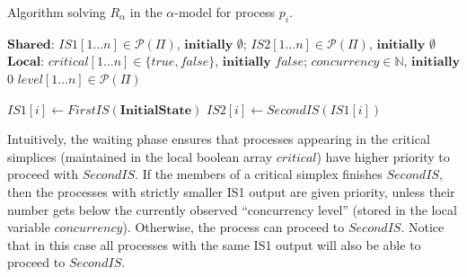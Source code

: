 \documentclass[a4paper]{article}
\begin{document}
\begin{algorithm}
\begin{small}
 \caption{Algorithm solving $R_{\alpha}$ in the $\alpha$-model for process $p_i$.\label{Alg:R_A_resolution}}
%
$\mathbf{Shared}$: $\mathit{IS1}[1\dots n] \in \mathcal{P}(\Pi)$, $\mathbf{initially}$ $\emptyset$;
$\mathit{IS2}[1\dots n] \in \mathcal{P}(\Pi)$, $\mathbf{initially}$ $\emptyset$\;
$\mathbf{Local}$: $\mathit{critical}[1\dots n] \in
\{\mathit{true},\mathit{false}\}$,
$\mathbf{initially}$ $\mathit{false}$;
$\mathit{concurrency} \in \mathbb{N}$,
$\mathbf{initially}$ $0$\;
$\mathit{level}[1\dots n]\in\mathcal{P}(\Pi)$\;
\vspace{1em}

	$\mathit{IS1}[i] \leftarrow \mathit{FirstIS}(\mathbf{InitialState})$\;
	\Do{$(\neg critical[i])\wedge(|\{p_j\in\mathit{IS1}[i]: 
	\mathit{IS2}[j]=\emptyset\wedge
	\emptyset\subsetneq \mathit{IS1}[j]\subsetneq\mathit{IS1}[i]\wedge
	\neg \mathit{critical}[j]\}|\geq \mathit{concurrency}
	)$}{\label{Alg:RA:WaitBegin}
	  \ForAll{$j\in \{1,\dots,n\}$}{
                        $\mathit{level}[j] \leftarrow   \{p_k\in \Pi, \mathit{IS1}[k]=\mathit{IS1}[j]\}$\;  
                      $\mathit{critical}[j] \leftarrow
            \left(\alpha(\mathit{IS1}[j])>\alpha(\mathit{IS1}[j]\setminus\mathit{level}[j])\right)$\;\label{Alg:RA:UpdateCritical}
			
	    \If{$\left(\alpha(\mathit{IS1}[j])>\alpha(\mathit{IS1}[j]\setminus\{p_k\in
              \mathit{level}[j], \mathit{IS2}[k]\neq \emptyset\}\right)$}{
          	    $\mathit{concurrency} \leftarrow \textit{max}(\alpha(\mathit{IS1}[j]),\mathit{concurrency})$\;\label{Alg:RA:UpdateConc}
 			}
		}
	}\label{Alg:RA:WaitEnd}
	$\mathit{IS2}[i] \leftarrow \mathit{SecondIS}(\mathit{IS1}[i])$\;		
		
\end{small}
\end{algorithm}

Intuitively, the waiting phase ensures that processes appearing 
in the critical simplices (maintained in the local
boolean array $\mathit{critical}$) have higher priority to
proceed with $\mathit{SecondIS}$.
%
If the members of a critical simplex finishes $\mathit{SecondIS}$, then
the processes with strictly smaller IS1 output are given priority,
unless their number gets below the currently observed
``concurrency level'' (stored in the local variable
$\mathit{concurrency}$). 
%
Otherwise, the process can proceed to $\mathit{SecondIS}$.
%
Notice that in this case all processes with the same IS1 output will
also be able to proceed to $\mathit{SecondIS}$. 
\end{document}
